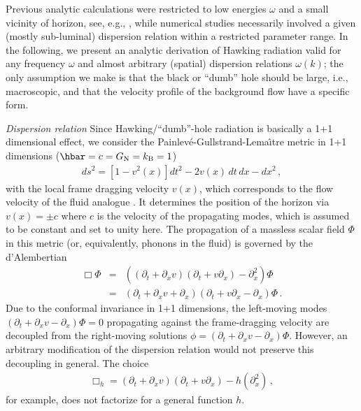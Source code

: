 \documentclass[aps,prl,showpacs,amssymb,nofootinbib,twocolumn]{revtex4}
\newcommand{\nn}{\nonumber\\}
\newcommand{\bea}{\begin{eqnarray}}
\newcommand{\ea}{\end{eqnarray}}
\begin{document}

Previous analytic calculations were restricted to low energies
$\omega$ and a small vicinity of horizon, see, e.g.,
\cite{universality}, while numerical studies necessarily involved 
a given (mostly sub-luminal) dispersion relation within a restricted
parameter range. 
%
In the following, we present an analytic derivation of Hawking
radiation valid for any frequency $\omega$ and almost arbitrary
(spatial) dispersion relations $\omega(k)$; the only assumption we
make is that the black or ``dumb'' hole should be large, i.e.,
macroscopic, and that the velocity profile of the background flow have 
a specific form.  

{\em Dispersion relation}\quad
%
Since Hawking/``dumb''-hole radiation is basically a 1+1 dimensional
effect, we consider the Painlev{\'e}-Gullstrand-Lema{\^\i}tre metric 
in 1+1 dimensions ($\hbar=c=G_{\rm N}=k_{\rm B}=1$)
%
\bea
ds^2=\left[1-v^2(x)\right]dt^2-2v(x)\,dt\,dx-dx^2
\,,
\ea
%
with the local frame dragging velocity $v(x)$, which
corresponds to the flow velocity of the fluid analogue
\cite{unruh-prl}.  
%
It determines the position of the horizon via $v(x)=\pm c$ where $c$
is the velocity of the propagating modes, which is assumed to be
constant and set to unity here. 
%
The propagation of a massless scalar field $\Phi$ in this metric 
(or, equivalently, phonons in the fluid) is governed by the
d'Alembertian  
%
\bea
\label{box}
\Box\Phi
&=&
\left((\partial_t+\partial_xv)(\partial_t+v\partial_x)-\partial_x^2\right)
\Phi
\nn
&=&
(\partial_t+\partial_xv+\partial_x)(\partial_t+v\partial_x-\partial_x)\Phi 
\,.
\ea
%
Due to the conformal invariance in 1+1 dimensions, the left-moving modes 
$(\partial_t+\partial_xv-\partial_x)\Phi=0$ propagating against the 
frame-dragging velocity are decoupled from the right-moving solutions 
$\phi=(\partial_t+\partial_xv-\partial_x)\Phi$.
%
However, an arbitrary modification of the dispersion relation would
not preserve this decoupling in general. 
%
The choice 
%
\bea
\label{arbitrary}
\Box_h
=
(\partial_t+\partial_xv)(\partial_t+v\partial_x)-
h(\partial_x^2) 
\,,
\ea
%
for example, does not factorize for a general function $h$. 
\end{document}
